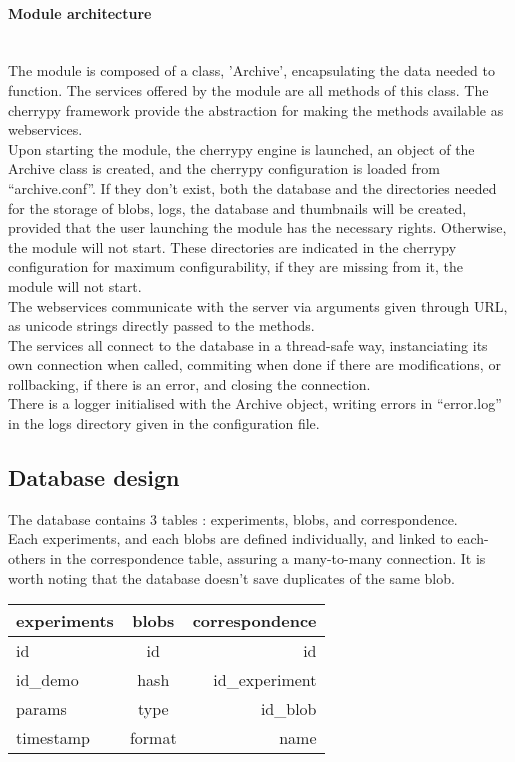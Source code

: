 \paragraph{Module architecture} \hspace{0pt} \\
The module is composed of a class, 'Archive', encapsulating the data needed to function. The services offered by the module are all methods of this class. The cherrypy framework provide the abstraction for making the methods available as webservices. \\
Upon starting the module, the cherrypy engine is launched, an object of the Archive class is created, and the cherrypy configuration is loaded from ``archive.conf''. If they don't exist, both the database and the directories needed for the storage of blobs, logs, the database and thumbnails will be created, provided that the user launching the module has the necessary rights. Otherwise, the module will not start. These directories are indicated in the cherrypy configuration for maximum configurability, if they are missing from it, the module will not start. \\
The webservices communicate with the server via arguments given through URL, as unicode strings directly passed to the methods. \\
The services all connect to the database in a thread-safe way, instanciating its own connection when called, commiting when done if there are modifications, or rollbacking, if there is an error, and closing the connection. \\
There is a logger initialised with the Archive object, writing errors in ``error.log'' in the logs directory given in the configuration file.

\subsection{Database design}

The database contains 3 tables : experiments, blobs, and correspondence.\\
Each experiments, and each blobs are defined individually, and linked to each-others in the correspondence table, assuring a many-to-many connection. It is worth noting that the database doesn't save duplicates of the same blob. \\

\begin{tabular}{|l|c|r|}
  \hline
  experiments & blobs & correspondence \\
  \hline
  id & id & id \\
  id\_demo & hash & id\_experiment \\
  params & type & id\_blob \\
  timestamp & format & name \\
  \hline
\end{tabular} \\

